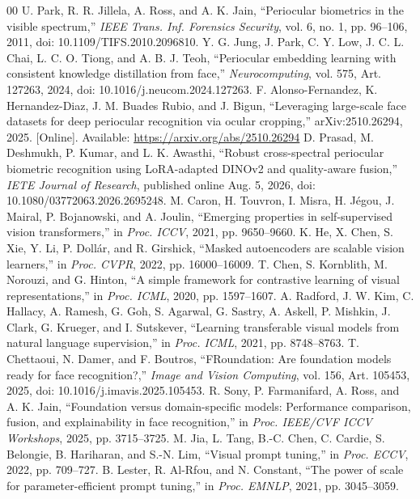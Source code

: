 \documentclass[12pt,a4paper,oneside]{report}
\begin{document}
\begin{thebibliography}{00}
 U. Park, R. R. Jillela, A. Ross, and A. K. Jain, ``Periocular biometrics in the visible spectrum,'' \textit{IEEE Trans. Inf. Forensics Security}, vol. 6, no. 1, pp. 96--106, 2011, doi: 10.1109/TIFS.2010.2096810.
 Y. G. Jung, J. Park, C. Y. Low, J. C. L. Chai, L. C. O. Tiong, and A. B. J. Teoh, ``Periocular embedding learning with consistent knowledge distillation from face,'' \textit{Neurocomputing}, vol. 575, Art. 127263, 2024, doi: 10.1016/j.neucom.2024.127263.
 F. Alonso-Fernandez, K. Hernandez-Diaz, J. M. Buades Rubio, and J. Bigun, ``Leveraging large-scale face datasets for deep periocular recognition via ocular cropping,'' arXiv:2510.26294, 2025. [Online]. Available: \url{https://arxiv.org/abs/2510.26294}
 D. Prasad, M. Deshmukh, P. Kumar, and L. K. Awasthi, ``Robust cross-spectral periocular biometric recognition using LoRA-adapted DINOv2 and quality-aware fusion,'' \textit{IETE Journal of Research}, published online Aug. 5, 2026, doi: 10.1080/03772063.2026.2695248.
 M. Caron, H. Touvron, I. Misra, H. J\'egou, J. Mairal, P. Bojanowski, and A. Joulin, ``Emerging properties in self-supervised vision transformers,'' in \textit{Proc. ICCV}, 2021, pp. 9650--9660.
 K. He, X. Chen, S. Xie, Y. Li, P. Doll\'ar, and R. Girshick, ``Masked autoencoders are scalable vision learners,'' in \textit{Proc. CVPR}, 2022, pp. 16000--16009.
 T. Chen, S. Kornblith, M. Norouzi, and G. Hinton, ``A simple framework for contrastive learning of visual representations,'' in \textit{Proc. ICML}, 2020, pp. 1597--1607.
 A. Radford, J. W. Kim, C. Hallacy, A. Ramesh, G. Goh, S. Agarwal, G. Sastry, A. Askell, P. Mishkin, J. Clark, G. Krueger, and I. Sutskever, ``Learning transferable visual models from natural language supervision,'' in \textit{Proc. ICML}, 2021, pp. 8748--8763.
 T. Chettaoui, N. Damer, and F. Boutros, ``FRoundation: Are foundation models ready for face recognition?,'' \textit{Image and Vision Computing}, vol. 156, Art. 105453, 2025, doi: 10.1016/j.imavis.2025.105453.
 R. Sony, P. Farmanifard, A. Ross, and A. K. Jain, ``Foundation versus domain-specific models: Performance comparison, fusion, and explainability in face recognition,'' in \textit{Proc. IEEE/CVF ICCV Workshops}, 2025, pp. 3715--3725.
 M. Jia, L. Tang, B.-C. Chen, C. Cardie, S. Belongie, B. Hariharan, and S.-N. Lim, ``Visual prompt tuning,'' in \textit{Proc. ECCV}, 2022, pp. 709--727.
 B. Lester, R. Al-Rfou, and N. Constant, ``The power of scale for parameter-efficient prompt tuning,'' in \textit{Proc. EMNLP}, 2021, pp. 3045--3059.

\end{thebibliography}
\end{document}
